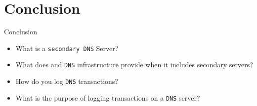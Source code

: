 \documentclass[xcolor=table]{beamer}
\begin{document}
\section*{Conclusion}
\begin{frame}{Conclusion}
  \begin{itemize}
    \item What is a \texttt{secondary DNS} Server?
    \item What does and \texttt{DNS} infrastructure provide when it includes secondary servers?
    \item How do you log \texttt{DNS} transactions?
    \item What is the purpose of logging transactions on a \texttt{DNS} server?
  \end{itemize}
\end{frame}
\end{document}
